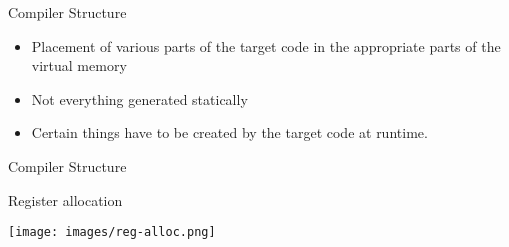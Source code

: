 \documentclass{beamer}
\newcommand{\myheader}[1]{
	{\color{darkblue}
		\begin{Large}
			\begin{center}
				{#1}
			\end{center}
		\end{Large}
	}
}
\begin{document}
\begin{frame}{Compiler Structure}
\begin{center}
{
}
\end{center}

\begin{scriptsize}
\begin{itemize}
\item Placement of various parts of the target code in the appropriate parts of the virtual memory
\item Not everything generated statically
\item Certain things have to be created by the target code at runtime.
\end{itemize}
\end{scriptsize}
\end{frame}

\begin{frame}{Compiler Structure}

\myheader{Register allocation}

\begin{center}
\texttt{[image: images/reg-alloc.png]}
\end{center}

\end{frame}
\end{document}
